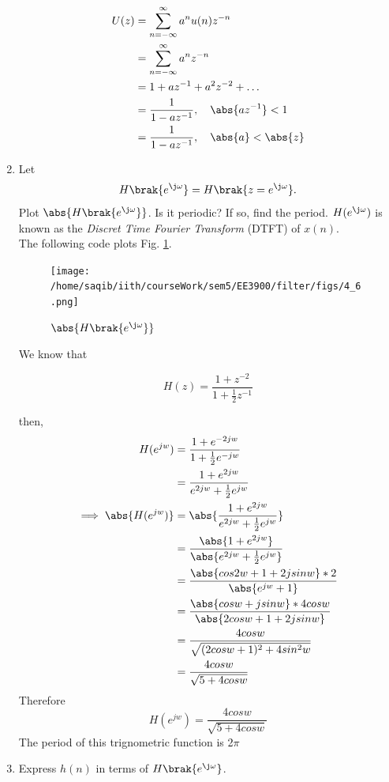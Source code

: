 \documentclass[journal,12pt,twocolumn]{IEEEtran}
\renewcommand\thesection{\arabic{section}}
\begin{document}
\begin{enumerate}[label=\thesection.\arabic*]
\begin{align}
	U(z) &= \sum _{n= -\infty}^{\infty}a^nu(n)z^{-n}
	\\&=\sum _{n= -\infty}^{\infty}a^nz^{-n}
	\\&= 1+az^{-1}+a^2z^{-2}+\dots
	\\&=\frac{1}{1-az^{-1}}, \quad \abs{az^{-1}} <1
	\\&=\frac{1}{1-az^{-1}}, \quad \abs{a} <\abs{z}
\end{align}
\item 
Let
\begin{equation}
H\brak{e^{\j \omega}} = H\brak{z = e^{\j \omega}}.
\end{equation}
Plot $\abs{H\brak{e^{\j \omega}}}$.  Is it periodic? If so, find the period. $H(e^{\j \omega})$ is
known as the {\em Discret Time Fourier Transform} (DTFT) of $x(n)$.
\\
\solution The following code plots Fig. \ref{fig:dtft}.

\begin{figure}[!ht]
\centering
\texttt{[image: /home/saqib/iith/courseWork/sem5/EE3900/filter/figs/4\_6.png]}
\caption{$\abs{H\brak{e^{\j\omega}}}$}
\label{fig:dtft}
\end{figure}
We know that 

\begin{equation}
	H(z) = \frac{1 + z^{-2}}{1 + \frac{1}{2}z^{-1}}	
\end{equation}

then,
\begin{align}
	H(e^{jw}) &=  \frac{1 + e^{-2jw}}{1 + \frac{1}{2}e^{-jw}}
	\\&= \frac{1 + e^{2jw}}{e^{2jw} + \frac{1}{2}e^{jw}}
	\\ \implies \abs{H(e^{jw})} &= \abs{\frac{1 + e^{2jw}}{e^{2jw} + \frac{1}{2}e^{jw}} }
	\\&= \frac{\abs{1 + e^{2jw}}}{\abs{e^{2jw} + \frac{1}{2}e^{jw}}}
	\\&= \frac{\abs{cos2w+1+2jsinw}*2}{\abs{e^{jw} + 1}}
	\\&= \frac{\abs{cosw+jsinw}*4cosw}{\abs{2cosw+1+2jsinw}}
	\\&= \frac{4cosw}{\sqrt{(2cosw+1)^{2}+4sin^{2}w}}
	\\&= \frac{4cosw}{\sqrt{5+4cosw}}
\end{align}
Therefore 
\begin{equation}
	H(e^{jw}) = \frac{4cosw}{\sqrt{5+4cosw}}
\end{equation}
The period of this trignometric function is 2$\pi$


\item Express $h(n)$ in terms of $H\brak{e^{\j \omega}}$.
\end{enumerate}
\end{document}
